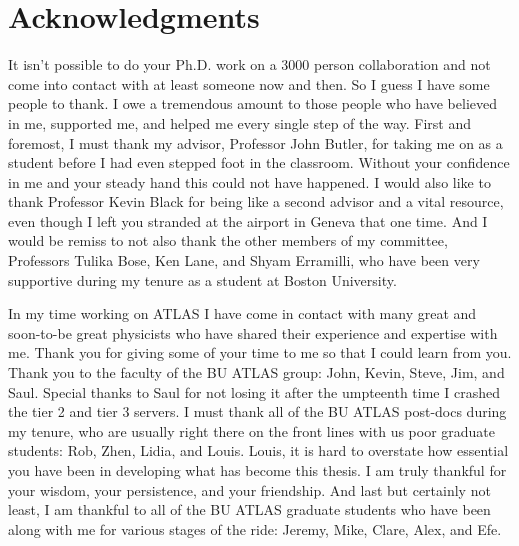\section*{Acknowledgments}

It isn't possible to do your Ph.D. work on a 3000 person collaboration and not 
come into contact with at least someone now and then. So I guess I have some people to thank.
I owe a tremendous amount to those people who have believed in me,
supported me, and helped me every single step of the way. First and foremost, I must
thank my advisor, Professor John Butler, for taking me on as a student before I had even stepped
foot in the classroom. Without your confidence in me and your steady hand
this could not have happened. I would also like to thank Professor Kevin Black
for being like a second advisor and a vital resource, even though
I left you stranded at the airport in Geneva that one time.
And I would be remiss to not also thank the other members of my committee, Professors Tulika
Bose, Ken Lane, and Shyam Erramilli, who have been very supportive
during my tenure as a student at Boston University. 


In my time working on ATLAS I have come in contact with many great and soon-to-be great 
physicists  who have shared their experience and expertise with me. Thank you for 
giving some of your time to me so that I could learn from you. 
Thank you to the faculty of the BU ATLAS group: John, Kevin, Steve, Jim, and Saul.
Special thanks to Saul for not losing it after the umpteenth time I crashed 
the tier 2 and tier 3 servers.
I must thank all of the BU ATLAS post-docs during my tenure, who are usually 
right there on the front lines with us poor graduate students: Rob, Zhen, Lidia, and Louis.
Louis, it is hard to overstate how essential you have been in developing what has become this thesis.
I am truly thankful for your wisdom, your persistence, and your friendship.
And last but certainly not least, I am thankful to all of the BU ATLAS graduate students 
who have been along with me for various stages of the ride: Jeremy, Mike, Clare, Alex, and Efe.


